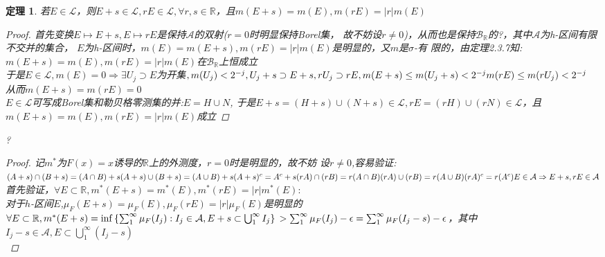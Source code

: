 \documentclass[12pt, a4paper, oneside]{ctexbook}
\newtheorem{theorem}{定理}[section]
\begin{document}
\begin{theorem}
    若$E\in\mathcal{L}$，则$E+s\in\mathcal{L},rE\in\mathcal{L},\forall r,s\in\mathbb{R}$，且$m(E+s)=
    m(E),m(rE)=|r|m(E)$
    \begin{proof}
        首先变换$E\mapsto E+s,E\mapsto rE$是保持$\mathcal{A}$的双射($r=0$时明显保持Borel集，
        故不妨设$r\neq 0$)，从而也是保持$\mathcal{B}_{\mathbb{R}}$的?，其中$\mathcal{A}$为h-区间有限不交并的集合，
        $E$为h-区间时，$m(E)= m(E+s),m(rE)=|r|m(E)$是明显的，又$m$是$\sigma$-有
        限的，由定理2.3.7知:\\
        $m(E+s)=m(E),m(rE)=|r|m(E)$在$\mathcal{B}_{\mathbb{R}}$上恒成立\\
        于是$E\in\mathcal{L},m(E)=0\Rightarrow \exists U_j\supset E$为开集$,m(U_j)<2^{-j},\\
        U_j+s\supset E+s,rU_j\supset rE,\\
        m(E+s)\leq m(U_j+s)<2^{-j}\\
        m(rE)\leq m(rU_j)<2^{-j}$\\
        从而$m(E+s)=m(rE)=0$\\
        $E\in\mathcal{L}$可写成Borel集和勒贝格零测集的并:$E=H\cup N$,
        于是$E+s=(H+s)\cup(N+s)\in\mathcal{L},rE=(rH)\cup(rN)\in\mathcal{L}$，且$m(E+s)=m(E),m(rE)=|r|m(E)$成立
    \end{proof}?
    \begin{proof}
        记$m^*$为$F(x)=x$诱导的$\mathbb{R}$上的外测度，$r=0$时是明显的，故不妨
        设$r\neq 0$,容易验证:\\
        $(A+s)\cap(B+s)=(A\cap B)+s\\
        (A+s)\cup(B+s)=(A\cup B)+s\\
        (A+s)^c=A^c+s\\
        (rA)\cap(rB)=r(A\cap B)\\
        (rA)\cup(rB)=r(A\cup B)\\
        (rA)^c=r(A^c)\\
        E\in\mathcal{A}\Rightarrow E+s,rE\in\mathcal{A}$\\
        首先验证，$\forall E\subset\mathbb{R},m^*(E+s)=m^*(E),m^*(rE)=|r|m^*(E):$\\
        对于$h$-区间$E$,$\mu_F(E+s)=\mu_F(E),\mu_F(rE)=|r|\mu_F(E)$是明显的\\
        $\forall E\subset\mathbb{R},m^*(E+s)=\inf\left\{\sum_1^{\infty}\mu_F(I_j):I_j\in\mathcal{A},E+s\subset\bigcup_1^{\infty}I_j\right\}\\
        > \sum_1^{\infty}\mu_F(I_j)-\epsilon=\sum_1^{\infty}\mu_F(I_j-s)-\epsilon$，其中$I_j-s\in\mathcal{A},E\subset\bigcup_1^{\infty}(I_j-s)$\\

\end{proof}
\end{theorem}
\end{document}
